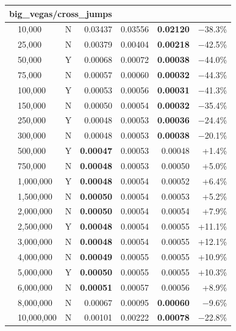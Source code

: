 \documentclass[9pt]{article}
\begin{document}
\begin{longtable}{llr|rrr|r}
\midrule
\multicolumn{7}{l}{\textbf{big\_vegas/cross\_jumps}} \\
\midrule
 & 10,000 & N & 0.03437 & 0.03556 & \textbf{0.02120} & $-$38.3\% \\
 & 25,000 & N & 0.00379 & 0.00404 & \textbf{0.00218} & $-$42.5\% \\
 & 50,000 & Y & 0.00068 & 0.00072 & \textbf{0.00038} & $-$44.0\% \\
 & 75,000 & N & 0.00057 & 0.00060 & \textbf{0.00032} & $-$44.3\% \\
 & 100,000 & Y & 0.00053 & 0.00056 & \textbf{0.00031} & $-$41.3\% \\
 & 150,000 & N & 0.00050 & 0.00054 & \textbf{0.00032} & $-$35.4\% \\
 & 250,000 & Y & 0.00048 & 0.00053 & \textbf{0.00036} & $-$24.4\% \\
 & 300,000 & N & 0.00048 & 0.00053 & \textbf{0.00038} & $-$20.1\% \\
\rowcolor{win} & 500,000 & Y & \textbf{0.00047} & 0.00053 & 0.00048 & +1.4\% \\
\rowcolor{win} & 750,000 & N & \textbf{0.00048} & 0.00053 & 0.00050 & +5.0\% \\
\rowcolor{win} & 1,000,000 & Y & \textbf{0.00048} & 0.00054 & 0.00052 & +6.4\% \\
\rowcolor{win} & 1,500,000 & N & \textbf{0.00050} & 0.00054 & 0.00053 & +5.2\% \\
\rowcolor{win} & 2,000,000 & N & \textbf{0.00050} & 0.00054 & 0.00054 & +7.9\% \\
\rowcolor{win} & 2,500,000 & Y & \textbf{0.00048} & 0.00054 & 0.00055 & +11.1\% \\
\rowcolor{win} & 3,000,000 & N & \textbf{0.00048} & 0.00054 & 0.00055 & +12.1\% \\
\rowcolor{win} & 4,000,000 & N & \textbf{0.00049} & 0.00055 & 0.00055 & +10.9\% \\
\rowcolor{win} & 5,000,000 & Y & \textbf{0.00050} & 0.00055 & 0.00055 & +10.3\% \\
\rowcolor{win} & 6,000,000 & N & \textbf{0.00051} & 0.00057 & 0.00056 & +8.9\% \\
 & 8,000,000 & N & 0.00067 & 0.00095 & \textbf{0.00060} & $-$9.6\% \\
 & 10,000,000 & N & 0.00101 & 0.00222 & \textbf{0.00078} & $-$22.8\% \\


\end{longtable}
\end{document}
